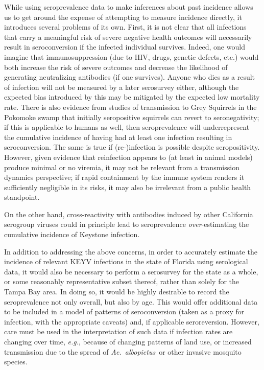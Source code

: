 \documentclass[12pt]{article}
\newcommand{\alb}{\textit{Ae.\ albopictus}}
\newcommand{\eg}{\textit{e.g.}}
\newcommand{\cjh}{\textcolor{blue}{cjh}}
\newcommand{\msg}[3]{(#1 $\rightarrow$ #2: #3)}
\newcommand{\mcc}[1]{\msg\cjh\cjh{#1}}
\begin{document}
        While using seroprevalence data to make inferences about past incidence allows us to get around the expense of attempting to measure incidence directly, it introduces several problems of its own. First, it is not clear that all infections that carry a meaningful risk of severe negative health outcomes will necessarily result in seroconversion if the infected individual survives. Indeed, one would imagine that immunosuppression (due to HIV, drugs, genetic defects, etc.) would both increase the risk of severe outcomes and decrease the likelihood of generating neutralizing antibodies (if one survives). Anyone who dies as a result of infection will not be measured by a later serosurvey either, although the expected bias introduced by this may be mitigated by the expected low mortality rate. There is also evidence from studies of transmission to Grey Squirrels in the Pokomoke swamp\cite{watts1988maintenance} that initially seropositive squirrels can revert to seronegativity; if this is applicable to humans as well, then seroprevalence will underrepresent the cumulative incidence of having had at least one infection resulting in seroconversion. The same is true if (re-)infection is possible despite seropositivity. However, given evidence that reinfection appears to (at least in animal models) produce minimal or no viremia\cite{watts1988maintenance,watts1979experimental}, it may not be relevant from a transmission dynamics perspective; if rapid containment by the immune system renders it sufficiently negligible in its risks, it may also be irrelevant from a public health standpoint. 

        On the other hand, cross-reactivity with antibodies induced by other California serogroup viruses could in principle lead to seroprevalence \textit{over}-estimating the cumulative incidence of Keystone infection.

        In addition to addressing the above concerns, in order to accurately estimate the incidence of relevant KEYV infections in the state of Florida using serological data, it would also be necessary to perform a serosurvey for the state as a whole, or some reasonably representative subset thereof, rather than solely for the Tampa Bay area. In doing so, it would be highly desirable to record the seroprevalence not only overall, but also by age. This would offer additional data to be included in a model of patterns of seroconversion (taken as a proxy for infection, with the appropriate caveats) and, if applicable seroreversion. However, care must be used in the interpretation of such data if infection rates are changing over time, \eg, because of changing patterns of land use, or increased transmission due to the spread of \alb\ or other invasive mosquito species.
\end{document}
